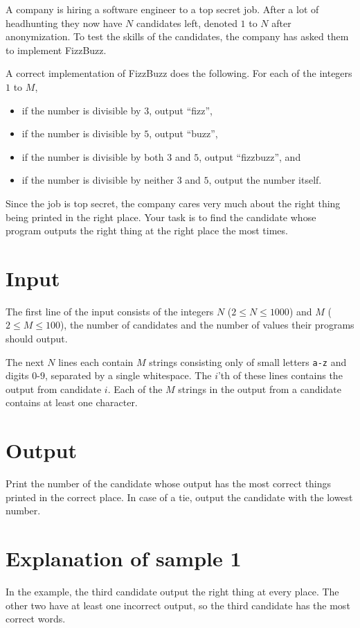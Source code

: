 A company is hiring a software engineer to a top secret job.
After a lot of headhunting they now have $N$ candidates left, denoted $1$ to $N$ after anonymization.
To test the skills of the candidates, the company has asked them to implement FizzBuzz.

A correct implementation of FizzBuzz does the following.
For each of the integers $1$ to $M$,
\begin{itemize}
  \item if the number is divisible by $3$, output ``fizz'',
  \item if the number is divisible by $5$, output ``buzz'',
  \item if the number is divisible by both $3$ and $5$, output ``fizzbuzz'', and
  \item if the number is divisible by neither $3$ and $5$, output the number itself.
\end{itemize}

Since the job is top secret, the company cares very much about the right thing being printed in the right place.
Your task is to find the candidate whose program outputs the right thing at the right place the most times.

\section*{Input}
The first line of the input consists of the integers $N$ ($2 \leq N \leq 1000$) and $M$ ($2 \leq M \leq 100$), the number of candidates and the number of values their programs should output.

The next $N$ lines each contain $M$ strings consisting only of small letters \texttt{a-z} and digits $0$-$9$, separated by a single whitespace.
The $i$'th of these lines contains the output from candidate $i$.
Each of the $M$ strings in the output from a candidate contains at least one character.

\section*{Output}
Print the number of the candidate whose output has the most correct things printed in the correct place.
In case of a tie, output the candidate with the lowest number.

\section*{Explanation of sample 1}
In the example, the third candidate output the right thing at every place.
The other two have at least one incorrect output, so the third candidate has the most correct words.
